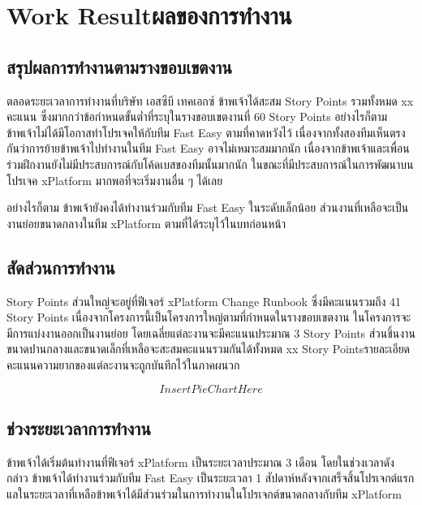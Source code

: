 \chapter{\ifenglish Work Result\else ผลของการทำงาน\fi}

\section{สรุปผลการทำงานตามรางขอบเขตงาน}
ตลอดระยะเวลาการทำงานที่บริษัท เอสซีบี เทคเอกซ์ ข้าพเจ้าได้สะสม Story Points รวมทั้งหมด xx คะแนน ซึ่งมากกว่าข้อกำหนดขั้นต่ำที่ระบุในรางขอบเขตงานที่ 60 Story Points อย่างไรก็ตาม ข้าพเจ้าไม่ได้มีโอกาสทำโปรเจคให้กับทีม Fast Easy ตามที่คาดหวังไว้ เนื่องจากทั้งสองทีมเห็นตรงกันว่าการย้ายข้าพเจ้าไปทำงานในทีม Fast Easy อาจไม่เหมาะสมมากนัก เนื่องจากข้าพเจ้าและเพื่อนร่วมฝึกงานยังไม่มีประสบการณ์กับโค้ดเบสของทีมนั้นมากนัก ในขณะที่มีประสบการณ์ในการพัฒนาบนโปรเจค xPlatform มากพอที่จะเริ่มงานอื่น ๆ ได้เลย

อย่างไรก็ตาม ข้าพเจ้ายังคงได้ทำงานร่วมกับทีม Fast Easy ในระดับเล็กน้อย ส่วนงานที่เหลือจะเป็นงานย่อยขนาดกลางในทีม xPlatform ตามที่ได้ระบุไว้ในบทก่อนหน้า

\section{สัดส่วนการทำงาน}
Story Points ส่วนใหญ่จะอยู่ที่ฟีเจอร์ xPlatform Change Runbook ซึ่งมีคะแนนรวมถึง 41 Story Points เนื่องจากโครงการนี้เป็นโครงการใหญ่ตามที่กำหนดในรางขอบเขตงาน ในโครงการจะมีการแบ่งงานออกเป็นงานย่อย โดยเฉลี่ยแต่ละงานจะมีคะแนนประมาณ 3 Story Points ส่วนชิ้นงานขนาดปานกลางและขนาดเล็กที่เหลือจะสะสมคะแนนรวมกันได้ทั้งหมด xx Story Points\enskip รายละเอียดคะแนนความยากของแต่ละงานจะถูกบันทึกไว้ในภาคผนวก

\[Insert Pie Chart Here\]

\section{ช่วงระยะเวลาการทำงาน}ข้าพเจ้าได้เริ่มต้นทำงานที่ฟีเจอร์ xPlatform เป็นระยะเวลาประมาณ 3 เดือน โดยในช่วงเวลาดังกล่าว ข้าพเจ้าได้ทำงานร่วมกับทีม Fast Easy เป็นระยะเวลา 1 สัปดาห์หลังจากเสร็จสิ้นโปรเจกต์แรก แลในระยะเวลาที่เหลือข้าพเจ้าได้มีส่วนร่วมในการทำงานในโปรเจกต์ขนาดกลางกับทีม xPlatform 